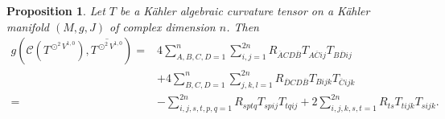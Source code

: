 \documentclass{amsart}
\newtheorem{proposition}[theorem]{Proposition}
\theoremstyle{definition}
\theoremstyle{remark}
\numberwithin{equation}{section}
\begin{document}
\begin{proposition}
\label{pro4.1}
Let $T$ be a K{\"a}hler algebraic curvature tensor on a  K{\"a}hler manifold $\left( {M,g,J} \right)$ of complex dimension $n$. Then
\begin{equation*}
\begin{aligned}
g\left( {{\mathcal{C} }\left( {{T^{{ \odot ^2}{V^{1,0}}}}} \right),\overline {{T^{{ \odot ^2}{V^{1,0}}}}} } \right)  =& 4\sum\limits_{A,B,C,D=1}^{n} {\sum\limits_{i,j=1}^{2n} {{R_{\overline A C  D \overline B}} {{T_{A\overline C ij}}{T_{B\overline D ij}}}} }\\
 &+ 4\sum\limits_{B,C,D=1}^{n} {\sum\limits_{j,k,l=1}^{2n} { {  {R_{\overline D C  D \overline B}}{T_{Bijk}}{T_{\overline C ijk}}} } }\\
 =&   - \sum\limits_{i,j,s,t,p,q = 1}^{2n} {{R_{sptq}}{T_{spij}}{T_{tqij}}}  + 2\sum\limits_{i,j,k,s,t = 1}^{2n} {{R_{ts}}{T_{tijk}}{T_{sijk}}} .
\end{aligned}
\end{equation*}
\end{proposition}
\end{document}
